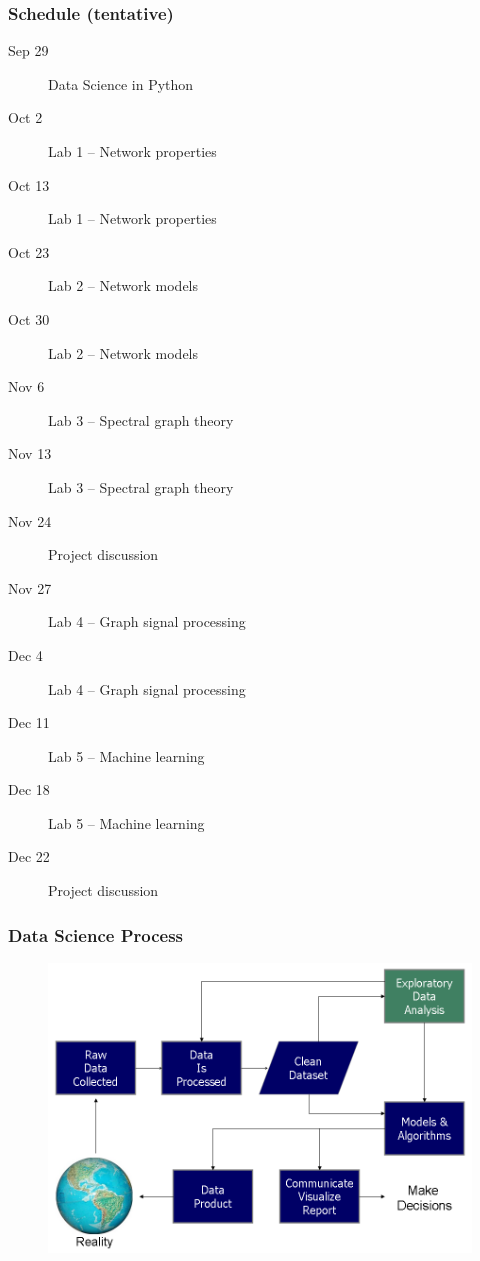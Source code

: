 \documentclass{beamer}
\begin{document}

\begin{frame}
	\frametitle{Schedule (tentative)}
	\begin{description}
		\item[Sep 29] Data Science in Python
		\item[Oct  2] Lab 1 -- Network properties
		\item[Oct 13] Lab 1 -- Network properties
		\item[Oct 23] Lab 2 -- Network models
		\item[Oct 30] Lab 2 -- Network models
		\item[Nov  6] Lab 3 -- Spectral graph theory
		\item[Nov 13] Lab 3 -- Spectral graph theory
		\item[Nov 24] Project discussion
		\item[Nov 27] Lab 4 -- Graph signal processing
		\item[Dec  4] Lab 4 -- Graph signal processing
		\item[Dec 11] Lab 5 -- Machine learning
		\item[Dec 18] Lab 5 -- Machine learning
		\item[Dec 22] Project discussion
	\end{description}
\end{frame}


\begin{frame}
	\frametitle{Data Science Process}
	\begin{figure}
		\includegraphics[width=\textwidth]{data_science_process}
	\end{figure}
\end{frame}
\end{document}
